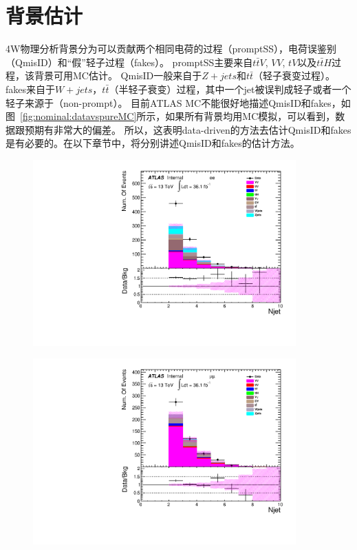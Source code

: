 \section{背景估计}\label{sec:bkg_estimation}
4W物理分析背景分为可以贡献两个相同电荷的过程（promptSS），电荷误鉴别（QmisID）和“假”轻子过程（fakes）。
promptSS主要来自$t\bar{t}V$, $VV$, $tV$以及$t\bar{t}H$过程，该背景可用MC估计。
QmisID一般来自于$Z+jets$和$t\bar{t}$（轻子衰变过程）。
fakes来自于$W+jets$，$t\bar{t}$（半轻子衰变）过程，其中一个jet被误判成轻子或者一个轻子来源于\bjet （non-prompt）。
目前ATLAS MC不能很好地描述QmisID和fakes，如图~\ref{fig:nominal:datavspureMC}所示，如果所有背景均用MC模拟，可以看到，数据跟预期有非常大的偏差。
所以，这表明data-driven的方法去估计QmisID和fakes是有必要的。在以下章节中，将分别讲述QmisID和fakes的估计方法。
\begin{figure}[h]
\begin{minipage}[t]{0.33\linewidth}
 \centering
 \includegraphics[width=0.9\textwidth,angle=-90]{fig/nominal/numOfjet_ee.pdf}
 \label{fig:nominal:numOfjet_ee.pdf}
 \end{minipage}
\begin{minipage}[t]{0.33\linewidth}
 \centering
 \includegraphics[width=0.9\textwidth,angle=-90]{fig/nominal/numOfjet_mumu.pdf}

\end{minipage}
\end{figure}
